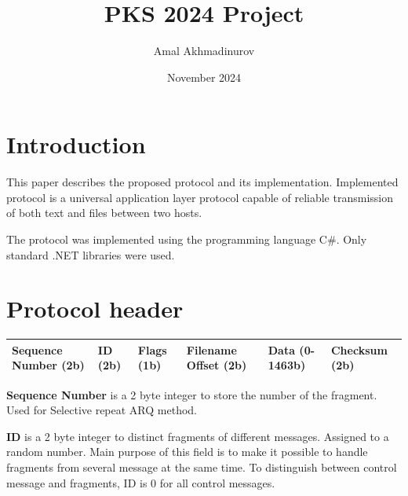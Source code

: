 \documentclass{article}
\title{PKS 2024 Project}
\author{Amal Akhmadinurov}
\date{November 2024}
\begin{document}
\maketitle
\tableofcontents
\newpage
\section{Introduction}


This paper describes the proposed protocol and its implementation.
Implemented protocol is a universal application layer protocol capable of reliable transmission of both text and files between two hosts. 


The protocol was implemented using the programming language C\#. Only standard .NET libraries were used.



\newpage
\section{Protocol header}


\begin{tabular}{|p{2cm}|p{1cm}|p{1cm}|p{2cm}|p{3cm}|p{2cm}|}
\hline
Sequence Number (2b) & 
ID (2b) & 
Flags  (1b)& 
Filename Offset (2b) &
Data (0-1463b) &
Checksum (2b)

\\
\hline




\end{tabular}
\newline
\newline

\textbf{Sequence Number} is a 2 byte integer to store the number of the fragment. Used for Selective repeat ARQ method. 
\newline

\textbf{ID}  is a 2 byte integer to distinct fragments of different messages. Assigned to a random number. Main purpose of this field is to make it possible to handle fragments from several message at the same time. To distinguish between control message and fragments, ID is 0 for all control messages.
\newline
\end{document}
